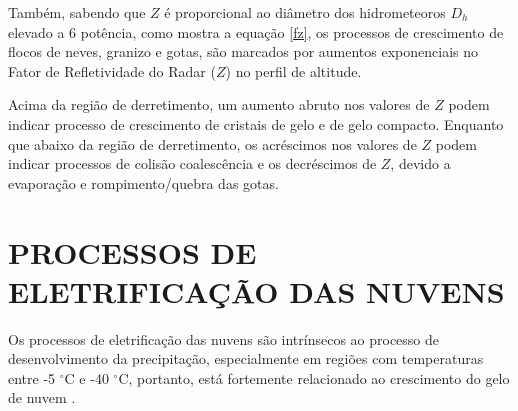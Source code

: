 
Também, sabendo que $Z$ é proporcional ao diâmetro dos hidrometeoros $D_h$ elevado a 6 potência, como mostra a equação \ref{fz}, os processos de crescimento de flocos de neves, granizo e gotas, são marcados por aumentos exponenciais no Fator de Refletividade do Radar ($Z$) no perfil de altitude. 


Acima da região de derretimento, um aumento abruto nos valores de $Z$ podem indicar processo de crescimento de cristais de gelo e de gelo compacto. Enquanto que abaixo da região de derretimento, os acréscimos nos valores de $Z$ podem indicar processos de colisão coalescência e os decréscimos de $Z$, devido a evaporação e rompimento/quebra das gotas. 




\section{PROCESSOS DE ELETRIFICAÇÃO DAS NUVENS}

Os processos de eletrificação das nuvens são intrínsecos ao processo de desenvolvimento da precipitação, especialmente em regiões com temperaturas entre -5 $^{\circ}$C e -40 $^{\circ}$C, portanto, está fortemente relacionado ao crescimento do gelo de nuvem \cite{mason1953}. 


